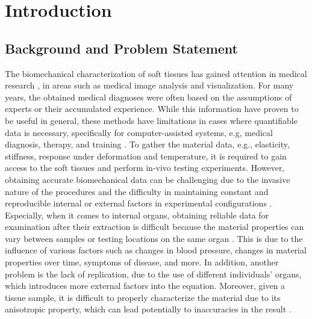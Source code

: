 
\chapter{Introduction} %

\label{Chapter2} %

\section{Background and Problem Statement}
The biomechanical characterization of soft tissues has gained attention
in medical research \cite{Cox2006}, in areas such as medical image analysis and visualization.
For many years, the obtained medical diagnoses were often based on the assumptions of experts or 
their accumulated experience. While this information have proven to be useful in general, 
these methods have limitations in cases where quantifiable data is necessary, specifically for computer-assisted systems, e.g,
medical diagnosis, therapy, and training \cite{Kauer2002}.
To gather the material data, e.g., elasticity, stiffness, response under deformation and temperature, it is required 
to gain access to the soft tissues and perform in-vivo testing experiments. 
However, obtaining accurate biomechanical data can be challenging 
due to the invasive nature of the procedures and the difficulty in maintaining constant and reproducible internal or external factors  
in experimental configurations \cite{Carter2001}.\\

Especially, when it comes to internal organs, obtaining reliable data for examination after their 
extraction is difficult because the material properties can vary between samples or testing 
locations on the same organ \cite{Chai2013}. This is due to the influence of various factors such as changes in blood pressure, changes in material properties 
over time, symptoms of disease, and more. In addition, another problem is the lack 
of replication, due to the use of different individuals' organs, which introduces more external
factors into the equation. Moreover, given a tissue sample, it is difficult to properly 
characterize the material due to its anisotropic property, which can lead potentially
 to inaccuracies in the result \cite{Cox2006}.

